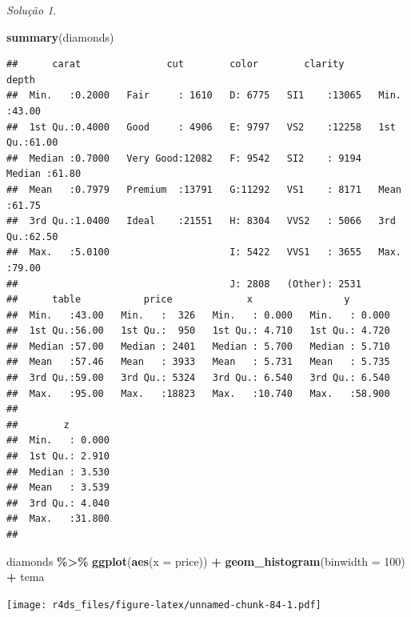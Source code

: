 \documentclass[
]{latex/krantz}
\newenvironment{Shaded}{\begin{snugshade}}{\end{snugshade}}
\newcommand{\AttributeTok}[1]{\textcolor[rgb]{0.13,0.29,0.53}{#1}}
\newcommand{\DecValTok}[1]{\textcolor[rgb]{0.00,0.00,0.81}{#1}}
\newcommand{\FunctionTok}[1]{\textcolor[rgb]{0.13,0.29,0.53}{\textbf{#1}}}
\newcommand{\NormalTok}[1]{#1}
\newcommand{\SpecialCharTok}[1]{\textcolor[rgb]{0.81,0.36,0.00}{\textbf{#1}}}
\theoremstyle{definition}
\theoremstyle{definition}
\theoremstyle{definition}
\theoremstyle{definition}
\theoremstyle{remark}
\newtheorem*{solution}{Solução}
\begin{document}
\begin{solution}
\leavevmode

\begin{Shaded}
\begin{Highlighting}[]
\FunctionTok{summary}\NormalTok{(diamonds)}
\end{Highlighting}
\end{Shaded}

\begin{verbatim}
##      carat               cut        color        clarity          depth      
##  Min.   :0.2000   Fair     : 1610   D: 6775   SI1    :13065   Min.   :43.00  
##  1st Qu.:0.4000   Good     : 4906   E: 9797   VS2    :12258   1st Qu.:61.00  
##  Median :0.7000   Very Good:12082   F: 9542   SI2    : 9194   Median :61.80  
##  Mean   :0.7979   Premium  :13791   G:11292   VS1    : 8171   Mean   :61.75  
##  3rd Qu.:1.0400   Ideal    :21551   H: 8304   VVS2   : 5066   3rd Qu.:62.50  
##  Max.   :5.0100                     I: 5422   VVS1   : 3655   Max.   :79.00  
##                                     J: 2808   (Other): 2531                  
##      table           price             x                y         
##  Min.   :43.00   Min.   :  326   Min.   : 0.000   Min.   : 0.000  
##  1st Qu.:56.00   1st Qu.:  950   1st Qu.: 4.710   1st Qu.: 4.720  
##  Median :57.00   Median : 2401   Median : 5.700   Median : 5.710  
##  Mean   :57.46   Mean   : 3933   Mean   : 5.731   Mean   : 5.735  
##  3rd Qu.:59.00   3rd Qu.: 5324   3rd Qu.: 6.540   3rd Qu.: 6.540  
##  Max.   :95.00   Max.   :18823   Max.   :10.740   Max.   :58.900  
##                                                                   
##        z         
##  Min.   : 0.000  
##  1st Qu.: 2.910  
##  Median : 3.530  
##  Mean   : 3.539  
##  3rd Qu.: 4.040  
##  Max.   :31.800  
## 
\end{verbatim}

\begin{Shaded}
\begin{Highlighting}[]
\NormalTok{diamonds }\SpecialCharTok{\%\textgreater{}\%}
    \FunctionTok{ggplot}\NormalTok{(}\FunctionTok{aes}\NormalTok{(}\AttributeTok{x =}\NormalTok{ price)) }\SpecialCharTok{+}
        \FunctionTok{geom\_histogram}\NormalTok{(}\AttributeTok{binwidth =} \DecValTok{100}\NormalTok{) }\SpecialCharTok{+}
\NormalTok{        tema}
\end{Highlighting}
\end{Shaded}

\texttt{[image: r4ds\_files/figure-latex/unnamed-chunk-84-1.pdf]}

\end{solution}
\end{document}
